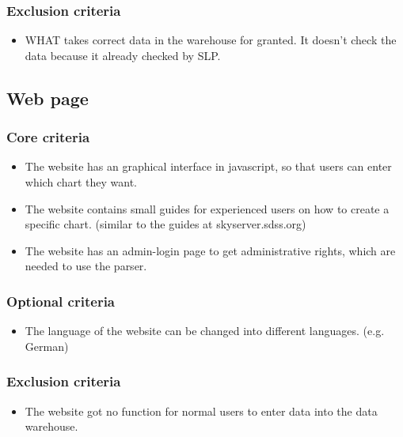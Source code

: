 \subsubsection{Exclusion criteria}
\begin{itemize}
\item WHAT takes correct data in the warehouse for granted. It doesn't check the
 data because it already checked by SLP. 
\end{itemize}


\subsection{Web page}
\subsubsection{Core criteria}
\begin{itemize}
\item The website has an graphical interface in javascript, so that users can enter which chart they want.
\item The website contains small guides for experienced users on how to create a specific chart. 
(similar to the guides at skyserver.sdss.org)
\item The website has an admin-login page to get administrative rights, which are needed to use the parser.
\end{itemize}

\subsubsection{Optional criteria}
\begin{itemize}
\item The language of the website can be changed into different languages. (e.g. German)
\end{itemize}

\subsubsection{Exclusion criteria}
\begin{itemize}
\item The website got no function for normal users to enter data into the data warehouse.
\end{itemize}

